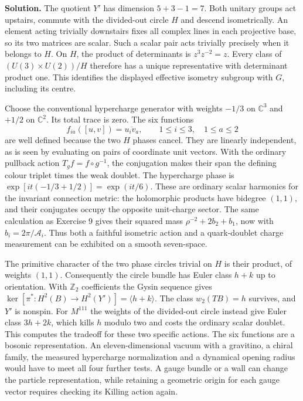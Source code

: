 \documentclass[10pt]{article}
\begin{document}
\noindent\textbf{Solution.}
The quotient $Y'$ has dimension $5+3-1=7$. Both unitary groups act upstairs, commute with the divided-out circle $H$ and descend isometrically. An element acting trivially downstairs fixes all complex lines in each projective base, so its two matrices are scalar. Such a scalar pair acts trivially precisely when it belongs to $H$. On $H$, the product of determinants is $z^3z^{-2}=z$. Every class of $(U(3)\times U(2))/H$ therefore has a unique representative with determinant product one. This identifies the displayed effective isometry subgroup with $G$, including its centre.

Choose the conventional hypercharge generator with weights $-1/3$ on $\mathbb C^3$ and $+1/2$ on $\mathbb C^2$. Its total trace is zero. The six functions
\begin{equation}
 f_{ia}([u,v])=\overline{u_i v_a},\qquad
 1\le i\le3,\quad 1\le a\le2
\end{equation}
are well defined because the two $H$ phases cancel. They are linearly independent, as is seen by evaluating on pairs of coordinate unit vectors. With the ordinary pullback action $T_g f=f\circ g^{-1}$, the conjugation makes their span the defining colour triplet times the weak doublet. The hypercharge phase is $\exp[it(-1/3+1/2)]=\exp(it/6)$. These are ordinary scalar harmonics for the invariant connection metric: the holomorphic products have bidegree $(1,1)$, and their conjugates occupy the opposite unit-charge sector. The same calculation as Exercise 9 gives their squared mass $\rho^{-2}+2b_2+b_1$, now with $b_i=2\pi/\mathcal A_i$. Thus both a faithful isometric action and a quark-doublet charge measurement can be exhibited on a smooth seven-space.

The primitive character of the two phase circles trivial on $H$ is their product, of weights $(1,1)$. Consequently the circle bundle has Euler class $h+k$ up to orientation. With $\mathbb Z_2$ coefficients the Gysin sequence gives $\ker[\pi^*:H^2(B)\to H^2(Y')]=\langle h+k\rangle$. The class $w_2(TB)=h$ survives, and $Y'$ is nonspin. For $M^{111}$ the weights of the divided-out circle instead give Euler class $3h+2k$, which kills $h$ modulo two and costs the ordinary scalar doublet. This computes the tradeoff for these two specific actions. The six functions are a bosonic representation. An eleven-dimensional vacuum with a gravitino, a chiral family, the measured hypercharge normalization and a dynamical opening radius would have to meet all four further tests. A gauge bundle or a wall can change the particle representation, while retaining a geometric origin for each gauge vector requires checking its Killing action again.
\end{document}
